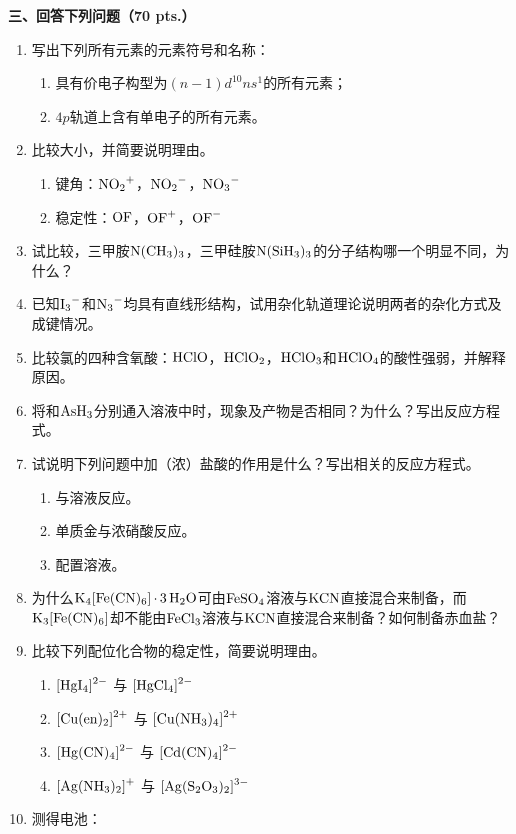 \vspace{0.5cm}
\noindent\textbf{三、回答下列问题（70 pts.）}

\begin{enumerate}[label=\arabic*., start=1, itemsep=1.5ex]
    \item 写出下列所有元素的元素符号和名称：
    \begin{enumerate}[label=(\arabic*), itemsep=1ex]
        \item 具有价电子构型为$(n-1)d^{10}ns^1$的所有元素；
        \item $4p$轨道上含有单电子的所有元素。
    \end{enumerate}
    \item 比较大小，并简要说明理由。
    \begin{enumerate}[label=(\arabic*), itemsep=1ex]
        \item 键角：$\ce{NO2^+}$，$\ce{NO2^-}$，$\ce{NO3^-}$
        \item 稳定性：$\ce{OF}$，$\ce{OF^+}$，$\ce{OF^-}$
    \end{enumerate}
    \item 试比较，三甲胺$\ce{N(CH3)3}$，三甲硅胺$\ce{N(SiH3)3}$的分子结构哪一个明显不同，为什么？
    \item 已知$\ce{I3^-}$和$\ce{N3^-}$均具有直线形结构，试用杂化轨道理论说明两者的杂化方式及成键情况。
    \item 比较氯的四种含氧酸：$\ce{HClO}$，$\ce{HClO2}$，$\ce{HClO3}$和$\ce{HClO4}$的酸性强弱，并解释原因。
    \item 将和$\ce{AsH3}$分别通入溶液中时，现象及产物是否相同？为什么？写出反应方程式。
    \item 试说明下列问题中加（浓）盐酸的作用是什么？写出相关的反应方程式。
    \begin{enumerate}[label=(\arabic*), itemsep=1ex]
        \item {}与溶液反应。
        \item 单质金与浓硝酸反应。
        \item 配置溶液。
    \end{enumerate}
    \item 为什么$\ce{K4[Fe(CN)6] * 3H2O}$可由$\ce{FeSO4}$溶液与$\ce{KCN}$直接混合来制备，而$\ce{K3[Fe(CN)6]}$却不能由$\ce{FeCl3}$溶液与$\ce{KCN}$直接混合来制备？如何制备赤血盐？
    \item 比较下列配位化合物的稳定性，简要说明理由。
    \begin{enumerate}[label=(\arabic*), itemsep=1ex]
        \item $\ce{[HgI4]^{2-}}$ 与 $\ce{[HgCl4]^{2-}}$
        \item $\ce{[Cu(en)2]^{2+}}$ 与 $\ce{[Cu(NH3)4]^{2+}}$
        \item $\ce{[Hg(CN)4]^{2-}}$ 与 $\ce{[Cd(CN)4]^{2-}}$
        \item $\ce{[Ag(NH3)2]^+}$ 与 $\ce{[Ag(S2O3)2]^{3-}}$
    \end{enumerate}
    \item 测得电池：
    

\end{enumerate}
